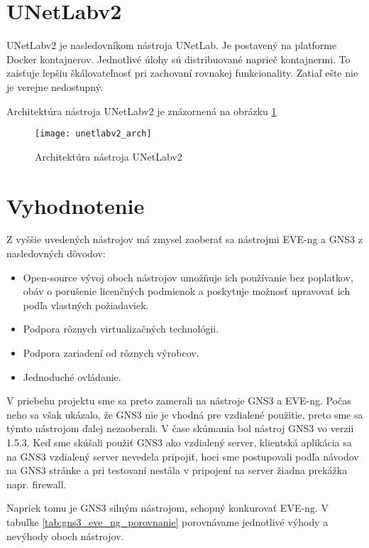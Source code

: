 \section{UNetLabv2}
\label{chap:unetlabv2}

UNetLabv2 je nasledovníkom nástroja UNetLab. Je postavený na platforme Docker kontajnerov. Jednotlivé úlohy sú distribuované naprieč kontajnermi. To zaisťuje lepšiu škálovateľnosť pri zachovaní rovnakej funkcionality. Zatiaľ ešte nie je verejne nedostupný. \cite{webiou_unetlab_unetlabv2}

Architektúra nástroja UNetLabv2 je znázornená na obrázku \ref{obr:unetlabv2_arch}

\begin{figure}
    \centering
    \texttt{[image: unetlabv2\_arch]}
    \caption{Architektúra nástroja UNetLabv2} \cite{obr_unetlabv2_arch}
    \label{obr:unetlabv2_arch}
\end{figure}





\section{Vyhodnotenie}

Z vyššie uvedených nástrojov má zmysel zaoberať sa nástrojmi EVE-ng a GNS3 z nasledovných dôvodov:
\begin{itemize}[noitemsep]
    \item Open-source vývoj oboch nástrojov umožňuje ich používanie bez poplatkov, obáv o porušenie licenčných podmienok a poskytuje možnosť upravovať ich podľa vlastných požiadaviek.
    \item Podpora rôznych virtualizačných technológii.
    \item Podpora zariadení od rôznych výrobcov.
    \item Jednoduché ovládanie.
\end{itemize}

V priebehu projektu sme sa preto zamerali na nástroje GNS3 a EVE-ng. Počas neho sa však ukázalo, že GNS3 nie je vhodná pre vzdialené použitie, preto sme sa týmto nástrojom ďalej nezaoberali. V čase skúmania bol nástroj GNS3 vo verzii 1.5.3. Keď sme skúšali použiť GNS3 ako vzdialený server, klientská aplikácia sa na GNS3 vzdialený server nevedela pripojiť, hoci sme postupovali podľa návodov na GNS3 stránke a pri testovaní nestála v pripojení na server žiadna prekážka napr. firewall.

Napriek tomu je GNS3 silným nástrojom, schopný konkurovať EVE-ng. V tabuľke \ref{tab:gns3_eve_ng_porovnanie} porovnávame jednotlivé výhody a nevýhody oboch nástrojov.

